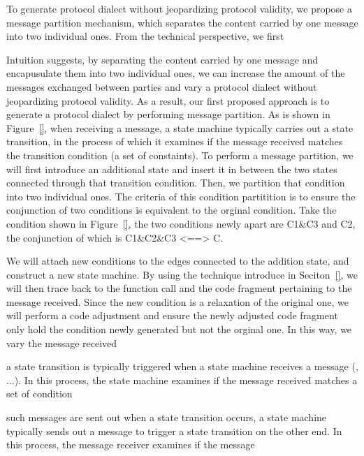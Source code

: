 To generate protocol dialect without jeopardizing protocol validity, we propose a message partition mechanism, which separates the content carried by one message into two individual ones. From the technical perspective, we first


Intuition suggests, by separating the content carried by one message and encapusulate them into two individual ones, we can increase the amount of the messages exchanged between parties and vary a protocol dialect without jeopardizing protocol validity. As a result, our first proposed approach is to generate a protocol dialect by performing message partition. As is shown in Figure~\ref{}, when receiving a message, a state machine typically carries out a state transition, in the process of which it examines if the message received matches the transition condition (\ie a set of constaints). To perform a message partition, we will first introduce an additional state and insert it in between the two states connected through that transition condition. Then, we partition that condition into two individual ones. The criteria of this condition partitition is to ensure the conjunction of two conditions is equivalent to the orginal condition. Take the condition shown in Figure~\ref{}, the two conditions newly apart are C1\&C3 and C2, the conjunction of which is C1\&C2\&C3 <==> C.    


We will attach new conditions to the edges connected to the addition state, and construct a new state machine.  By using the technique introduce in Seciton~\ref{}, we will then trace back to the function call and the code fragment pertaining to the message received. Since the new condition is a relaxation of the original one, we will perform a code adjustment and ensure the newly adjusted code fragment only hold the condition newly generated but not the orginal one. In this way, we vary the message received  

a state transition is typically triggered when a state machine receives a message (\eg, ...). In this process, the state machine examines if the message received matches a set of condition






such messages are sent out when a state transition occurs, a state machine typically sends out a message to trigger a state transition on the other end. In this process, the message receiver examines if the message     